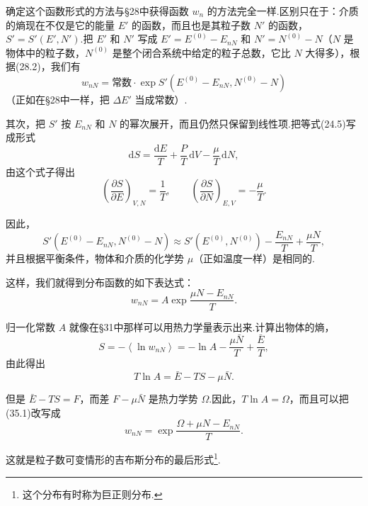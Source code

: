 确定这个函数形式的方法与§28中获得函数 $w_n$ 的方法完全一样.区别只在于：介质的熵现在不仅是它的能量 $E'$ 的函数，而且也是其粒子数 $N'$ 的函数，$S'=S'(E',N')$.把 $E'$ 和 $N'$ 写成 $E'=E^{(0)}-E_{nN}$ 和 $N'=N^{(0)}-N$（$N$ 是物体中的粒子数，$N^{(0)}$ 是整个闭合系统中给定的粒子总数，它比 $N$ 大得多），根据(28.2)，我们有
\begin{equation*}
  w_{nN}=\text{常数}\cdot\exp S'\left(E^{(0)}-E_{nN},N^{(0)}-N\right)
\end{equation*}
（正如在§28中一样，把 $\Delta E'$ 当成常数）.

其次，把 $S'$ 按 $E_{nN}$ 和 $N$ 的幂次展开，而且仍然只保留到线性项.把等式(24.5)写成形式
\begin{equation*}
  \mathrm{d}S=\frac{\mathrm{d}E}{T}+\frac{P}{T}\,\mathrm{d}V-\frac{\mu}{T}\,\mathrm{d}N,
\end{equation*}
由这个式子得出
\begin{equation*}
  \left(\frac{\partial S}{\partial E}\right)_{V,N}=\frac{1}{T},\qquad
  \left(\frac{\partial S}{\partial N}\right)_{E,V}=-\frac{\mu}{T}.
\end{equation*}

因此，
\begin{equation*}
  S'\left(E^{(0)}-E_{nN},N^{(0)}-N\right)
  \approx S'\left(E^{(0)},N^{(0)}\right)-\frac{E_{nN}}{T}+\frac{\mu N}{T},
\end{equation*}
并且根据平衡条件，物体和介质的化学势 $\mu$（正如温度一样）是相同的.

这样，我们就得到分布函数的如下表达式：
\begin{equation}
  w_{nN}=A\exp\frac{\mu N-E_{nN}}{T}.
\end{equation}

归一化常数 $A$ 就像在§31中那样可以用热力学量表示出来.计算出物体的熵，
\begin{equation*}
  S=-\left\langle\ln w_{nN}\right\rangle=-\ln A-\frac{\mu\bar{N}}{T}+\frac{\bar{E}}{T},
\end{equation*}
由此得出
\begin{equation*}
  T\ln A=\bar{E}-TS-\mu\bar{N}.
\end{equation*}

但是 $\bar{E}-TS=F$，而差 $F-\mu\bar{N}$ 是热力学势 $\Omega$.因此，$T\ln A=\Omega$，而且可以把(35.1)改写成
\begin{equation}
  w_{nN}=\exp\frac{\Omega+\mu N-E_{nN}}{T}.
\end{equation}

这就是粒子数可变情形的吉布斯分布的最后形式\footnote{这个分布有时称为巨正则分布.}.


